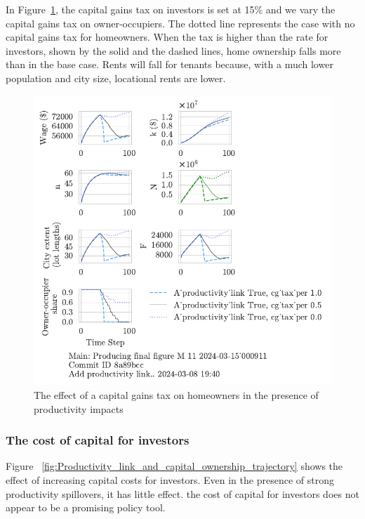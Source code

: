 {In Figure~\ref{fig:Productivity_link_and_CGpers_ownership_trajectory}, the capital gains tax on investors is set at 15\% and we vary the capital gains tax on owner-occupiers. The dotted line represents the case with no capital gains tax for homeowners. When the tax is higher than the rate for investors, shown by the solid and the dashed lines,  home ownership falls more than in the base case.  Rents will fall for tenants because, with a much lower population and city size, locational rents are lower.


\begin{figure}
    \centering
    \includegraphics[scale=.8, trim={0 1.4cm 0 0},clip]{fig/With-productivity_link_cg_tax_per-000911.pdf}
    \caption{The effect of a capital gains tax on homeowners in the presence of productivity impacts}
    \label{fig:Productivity_link_and_CGpers_ownership_trajectory}
\end{figure}

\newpage

\subsubsection{The cost of capital for investors}
Figure ~\ref{fig:Productivity_link_and_capital_ownership_trajectory} shows the effect of increasing capital costs for investors. Even in the presence of strong productivity spillovers, it has little effect.  the cost of capital for investors does not appear to be a promising policy tool.

}
